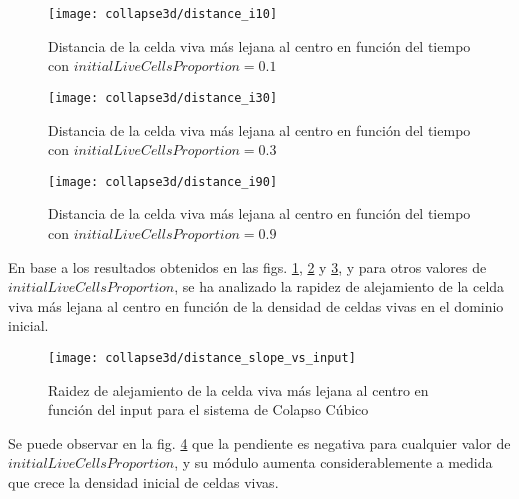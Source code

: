 \begin{figure}[H]
    \centering
    \texttt{[image: collapse3d/distance\_i10]}
    \caption{Distancia de la celda viva más lejana al centro en función del tiempo con $initialLiveCellsProportion = 0.1$}
    \label{fig:colapso3d_d10}
\end{figure}
\begin{figure}[H]
    \centering
    \texttt{[image: collapse3d/distance\_i30]}
    \caption{Distancia de la celda viva más lejana al centro en función del tiempo con $initialLiveCellsProportion = 0.3$}
    \label{fig:colapso3d_d30}
\end{figure}
\begin{figure}[H]
    \centering
    \texttt{[image: collapse3d/distance\_i90]}
    \caption{Distancia de la celda viva más lejana al centro en función del tiempo con $initialLiveCellsProportion = 0.9$}
    \label{fig:colapso3d_d90}
\end{figure}

En base a los resultados obtenidos en las figs. \ref{fig:colapso3d_d10}, \ref{fig:colapso3d_d30} y \ref{fig:colapso3d_d90},
y para otros valores de $initialLiveCellsProportion$, se ha analizado la rapidez de alejamiento de la celda viva más lejana
al centro en función de la densidad de celdas vivas en el dominio inicial.

\begin{figure}[H]
    \centering
    \texttt{[image: collapse3d/distance\_slope\_vs\_input]}
    \caption{Raidez de alejamiento de la celda viva más lejana al centro en función del input para el sistema de Colapso Cúbico}
    \label{fig:colapso3d_distance_slope_vs_input}
\end{figure}

Se puede observar en la fig. \ref{fig:colapso3d_distance_slope_vs_input} que la pendiente es negativa
para cualquier valor de $initialLiveCellsProportion$, y su módulo aumenta considerablemente
a medida que crece la densidad inicial de celdas vivas.
